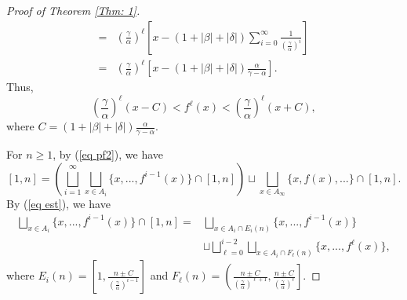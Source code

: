 \documentclass{amsart}
\theoremstyle{definition}
\numberwithin{equation}{section}%
\begin{document}
\begin{proof}[Proof of Theorem \ref{Thm: 1}]
\begin{align*}
  =&\left(\frac{\gamma}{\alpha}\right)^\ell \left[x-(1+|\beta|+|\delta|)\sum_{i=0}^{\infty} \frac{1}{\left(\frac{\gamma}{\alpha}\right)^{i}}\right]\\
  =&\left(\frac{\gamma}{\alpha}\right)^\ell \left[x-(1+|\beta|+|\delta|)\frac{\alpha}{\gamma-\alpha}\right].
\end{align*}
Thus,
\begin{equation}\label{eq est}
\left(\frac{\gamma}{\alpha}\right)^\ell \left(x-C\right)< f^\ell(x)<\left(\frac{\gamma}{\alpha}\right)^\ell \left(x+C\right),
\end{equation}
where $C=(1+|\beta|+|\delta|)\frac{\alpha}{\gamma-\alpha}$.

For $n\geq 1$, by (\ref{eq pf2}), we have
\begin{equation}\label{eq pf3}
    [1,n]= \left(\bigsqcup_{i=1}^\infty \bigsqcup_{x\in A_i}\{x, ..., f^{i-1}(x)\}\cap [1,n]\right) \sqcup \bigsqcup_{x\in A_\infty}\{x, f(x), ...\}\cap [1,n].
\end{equation}
By (\ref{eq est}), we have
\begin{equation}\label{eq pf4}
\begin{aligned}
     \bigsqcup_{x\in A_i}\{x, ..., f^{i-1}(x)\}\cap [1,n]=& \bigsqcup_{x\in A_i\cap E_i(n)}\{x, ..., f^{i-1}(x)\}\\
     &\sqcup \bigsqcup_{\ell=0}^{i-2}\bigsqcup_{x\in A_i\cap F_\ell(n)}\{x, ..., f^{\ell}(x)\},
\end{aligned}
\end{equation}
where $E_i(n)=\left[1, \frac{n\pm C}{\left(\frac{\gamma}{\alpha}\right)^{i-1}}\right]$ and $F_\ell(n)=\left(\frac{n\pm C}{\left(\frac{\gamma}{\alpha}\right)^{\ell+1}}, \frac{n\pm C}{\left(\frac{\gamma}{\alpha}\right)^{\ell}}\right]$.


\end{proof}
\end{document}
